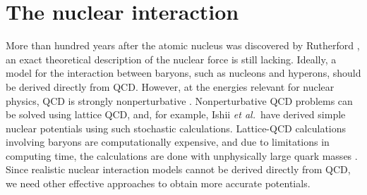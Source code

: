 \documentclass[a4paper,12pt]{report}
\begin{document}


\section{The nuclear interaction} \label{sec:nuclear_int}

More than hundred years after the atomic nucleus was 
discovered by Rutherford \cite{rutherford1911}, an exact 
theoretical description of the nuclear force is still lacking.
Ideally, a model for the interaction between baryons, such as
nucleons and hyperons, should be derived directly from QCD. 
However, at the energies relevant for nuclear physics, QCD is 
strongly nonperturbative \cite{machleidt2011}. Nonperturbative 
QCD problems can be solved using lattice QCD, and, for example, 
Ishii \emph{et al.}~have derived simple nuclear potentials 
\cite{ishii2007,nemura2009} 
using such stochastic calculations. Lattice-QCD calculations 
involving baryons are computationally  
expensive, and due to limitations in computing time, the 
calculations are done with unphysically large quark masses 
\cite{ishii2007,inoue2013}. Since realistic nuclear 
interaction models cannot be derived directly from QCD, we  
need other effective approaches to obtain more accurate 
potentials. 
\end{document}
